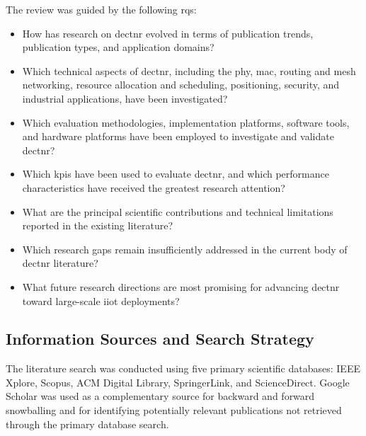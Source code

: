 The review was guided by the following \glspl{rq}:

\begin{itemize}

    \item[\textbf{RQ1}] How has research on \gls{dectnr} evolved in terms of publication trends, publication types, and application domains?

    \item[\textbf{RQ2}] Which technical aspects of \gls{dectnr}, including the \gls{phy}, \gls{mac}, routing and mesh networking, resource allocation     and scheduling, positioning, security, and industrial applications, have     been investigated?

    \item[\textbf{RQ3}] Which evaluation methodologies, implementation platforms, software tools, and hardware platforms have been employed to  investigate and validate \gls{dectnr}?

    \item[\textbf{RQ4}] Which \glspl{kpi} have been used to evaluate \gls{dectnr}, and which performance characteristics have received the     greatest research attention?

    \item[\textbf{RQ5}] What are the principal scientific contributions and technical limitations reported in the existing literature?

    \item[\textbf{RQ6}] Which research gaps remain insufficiently addressed in the current body of \gls{dectnr} literature?

    \item[\textbf{RQ7}] What future research directions are most promising for advancing \gls{dectnr} toward large-scale \gls{iiot} deployments?

\end{itemize}

\subsection{Information Sources and Search Strategy}
\label{subsec:search_strategy}

The literature search was conducted using five primary scientific databases: IEEE Xplore, Scopus, ACM Digital Library, SpringerLink, and ScienceDirect. Google Scholar was used as a complementary source for backward and forward snowballing and for identifying potentially relevant publications not retrieved through the primary database search.

